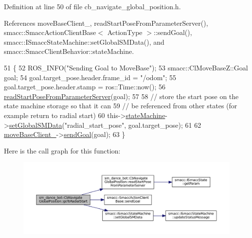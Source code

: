 Definition at line 50 of file cb\+\_\+navigate\+\_\+global\+\_\+position.\+h.



References move\+Base\+Client\+\_\+, read\+Start\+Pose\+From\+Parameter\+Server(), smacc\+::\+Smacc\+Action\+Client\+Base$<$ Action\+Type $>$\+::send\+Goal(), smacc\+::\+I\+Smacc\+State\+Machine\+::set\+Global\+S\+M\+Data(), and smacc\+::\+Smacc\+Client\+Behavior\+::state\+Machine.


\begin{DoxyCode}
51   \{
52     ROS\_INFO(\textcolor{stringliteral}{"Sending Goal to MoveBase"});
53     smacc::ClMoveBaseZ::Goal goal;
54     goal.target\_pose.header.frame\_id = \textcolor{stringliteral}{"/odom"};
55     goal.target\_pose.header.stamp = ros::Time::now();
56     \hyperlink{classsm__dance__bot_1_1CbNavigateGlobalPosition_a81b78925b3ab8a426f471cb74d0b9756}{readStartPoseFromParameterServer}(goal);
57 
58     \textcolor{comment}{// store the start pose on the state machine storage so that it can}
59     \textcolor{comment}{// be referenced from other states (for example return to radial start)}
60     this->\hyperlink{classsmacc_1_1SmaccClientBehavior_aa1c28c177d50a471c88c6a577cd6077e}{stateMachine}->\hyperlink{classsmacc_1_1ISmaccStateMachine_a8588f9e580fbb95b53e2bd2ca3ff1f98}{setGlobalSMData}(\textcolor{stringliteral}{"radial\_start\_pose"}, goal.target\_pose);
61 
62     \hyperlink{classsm__dance__bot_1_1CbNavigateGlobalPosition_a6b070ea39c113269c9b7f7732cb9e033}{moveBaseClient\_}->\hyperlink{classsmacc_1_1SmaccActionClientBase_a58c67a87c5fb8ea1633573c58fe3eee1}{sendGoal}(goal);
63   \}
\end{DoxyCode}


Here is the call graph for this function\+:
\nopagebreak
\begin{figure}[H]
\begin{center}
\leavevmode
\includegraphics[width=350pt]{classsm__dance__bot_1_1CbNavigateGlobalPosition_a0832f7a7f205cc483be012aef9501312_cgraph}
\end{center}
\end{figure}


